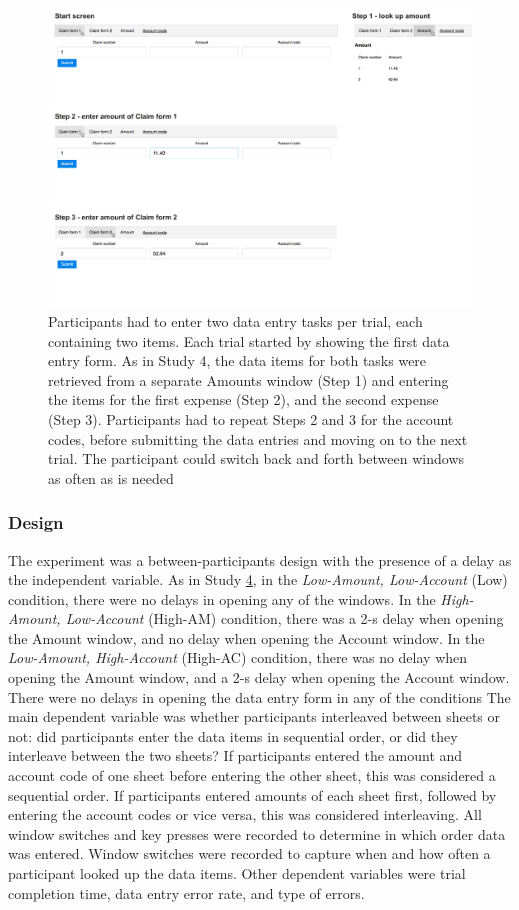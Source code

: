 \begin{figure}
\includegraphics[width=\textwidth]{images/ch34/ch34-5_Tasksequence.pdf}
    \caption[Study 5 data entry task layout]{Participants had to enter two data entry tasks per trial, each containing two items. Each trial started by showing the first data entry form. As in Study 4, the data items for both tasks were retrieved from a separate Amounts window (Step 1) and entering the items for the first expense (Step 2), and the second expense (Step 3). Participants had to repeat Steps 2 and 3 for the account codes, before submitting the data entries and moving on to the next trial. The participant could switch back and forth between windows as often as is needed}\label{fig:ch34_5-tasklayout}
\end{figure}

\subsubsection{Design}
The experiment was a between-participants design with the presence of a delay as the independent variable. 
As in Study \hyperref[st:Study4]{4}, in the \textit{Low-Amount, Low-Account} (Low) condition, there were no delays in opening any of the windows. In the \textit{High-Amount, Low-Account} (High-AM) condition, there was a 2-s delay when opening the Amount window, and no delay when opening the Account window. In the \textit{Low-Amount, High-Account} (High-AC) condition, there was no delay when opening the Amount window, and a 2-s delay when opening the Account window. There were no delays in opening the data entry form in any of the conditions 
The main dependent variable was whether participants interleaved between sheets or not: did participants enter the data items in sequential order, or did they interleave between the two sheets? If participants entered the amount and account code of one sheet before entering the other sheet, this was considered a sequential order. If participants entered amounts of each sheet first, followed by entering the account codes or vice versa, this was considered interleaving. All window switches and key presses were recorded to determine in which order data was entered. Window switches were recorded to capture when and how often a participant looked up the data items. Other dependent variables were trial completion time, data entry error rate, and type of errors.


